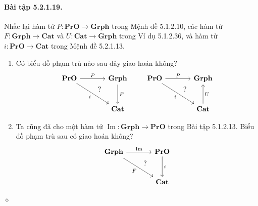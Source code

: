 \paragraph{Bài tập 5.2.1.19.} Nhắc lại hàm tử $P:\mathbf{PrO}\to\mathbf{Grph}$ trong Mệnh đề 5.1.2.10, các hàm tử $F:\mathbf{Grph}\to\mathbf{Cat}$ và $U:\mathbf{Cat}\to\mathbf{Grph}$ trong Ví dụ 5.1.2.36, và hàm tử $i:\mathbf{PrO}\to\mathbf{Cat}$ trong Mệnh đề 5.2.1.13.
\begin{enumerate}[label=\alph*.]
\item Có biểu đồ phạm trù nào sau đây giao hoán không?
\[\begin{tikzcd}[column sep=large,row sep=large]
\mathbf{PrO}\arrow[r,"P"]\arrow[dr,"i"']&\mathbf{Grph}\arrow[d,"F"]\\&\mathbf{Cat}\arrow[ul,phantom,"?"{xshift=10pt,yshift=6pt}]
\end{tikzcd}\qquad
\begin{tikzcd}[column sep=large,row sep=large]
\mathbf{PrO}\arrow[r,"P"]\arrow[dr,"i"']&\mathbf{Grph}\\&\mathbf{Cat}\arrow[u,"U"']\arrow[ul,phantom,"?"{xshift=10pt,yshift=6pt}]
\end{tikzcd}\]
\item Ta cũng đã cho một hàm tử $\operatorname{Im}:\mathbf{Grph}\to\mathbf{PrO}$ trong Bài tập 5.1.2.13. Biểu đồ phạm trù sau có giao hoán không?
\[\begin{tikzcd}[column sep=large,row sep=large]
\mathbf{Grph}\arrow[r,"\operatorname{Im}"]\arrow[dr,"F"']&\mathbf{PrO}\arrow[d,"i"]\\&\mathbf{Cat}\arrow[ul,phantom,"?"{xshift=10pt,yshift=6pt}]
\end{tikzcd}\]
\end{enumerate}\hfill$\diamond$
